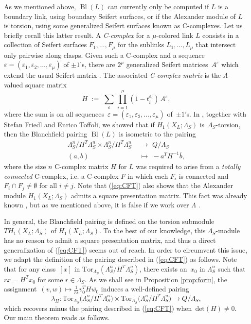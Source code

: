 \documentclass[11pt,a4paper]{amsart}
\theoremstyle{definition}
\def\op{\operatorname}
\begin{document}
As we mentioned above, $\op{Bl}(L)$ can currently only be computed if $L$ is a boundary link, using boundary Seifert surfaces, or if the Alexander module of $L$ is torsion, using some generalized Seifert surfaces known as C-complexes. Let us briefly recall this latter result. A \emph{C-complex} for a $\mu$-colored link $L$ consists in a collection of Seifert surfaces $F_1, \dots , F_\mu$ for the sublinks $L_1, \dots , L_\mu$ that intersect only pairwise along clasps. Given such a C-complex and a sequence~$\varepsilon=(\varepsilon_1,\varepsilon_2,\dots, \varepsilon_\mu)$ of $\pm 1$'s, there are $2^\mu$ generalized Seifert matrices~$A^\varepsilon$ which extend the usual Seifert matrix \cite{CimasoniPotential, CimasoniFlorens, Cooper}. The associated \emph{C-complex matrix} is the $\Lambda$-valued square matrix
$$H\,\,:=\,\,\sum_\varepsilon \,\prod_{i=1}^\mu (1-t_i^{\varepsilon_i}) \, A^\varepsilon,$$
where the sum is on all sequences~$\varepsilon=(\varepsilon_1,\varepsilon_2,\dots, \varepsilon_\mu)$ of~$\pm 1$'s. In \cite[Theorem 1.1]{ConwayFriedlToffoli}, together with Stefan Friedl and Enrico Toffoli, we showed that if $H_1(X_L;\Lambda_S)$ is~$\Lambda_S$-torsion, then the Blanchfield pairing $\op{Bl}(L)$ is isometric to the pairing
\begin{align}
\label{eq:CFT}
\Lambda_S^n / H^T \Lambda_S^n \times \Lambda_S ^n / H^T \Lambda_S^n &\,\,\rightarrow\,\, Q/\Lambda_S \\
(a,b) &\,\,\mapsto\,\, -a^T H^{-1}\overline{b}, \nonumber
\end{align}
where the size $n$ C-complex matrix $H$ for $L$ was required to arise from a \emph{totally connected} C-complex, i.e. a C-complex $F$ in which each $F_i$ is connected and $F_i \cap F_j  \neq \emptyset $ for all $i\neq j$. Note that (\ref{eq:CFT}) also shows that the Alexander module $H_1(X_L;\Lambda_S)$ admits a square presentation matrix. This fact was already known \cite[Corollary 3.6]{CimasoniFlorens}, but as we mentioned above, it is false if we work over $\Lambda$ \cite{CrowellStrauss, Hillman}.

In general, the Blanchfield pairing is defined on the torsion submodule $TH_1(X_L;\Lambda_S)$ of $H_1(X_L;\Lambda_S)$. To the best of our knowledge, this $\Lambda_S$-module has no reason to admit a square presentation matrix, and thus a direct generalization of (\ref{eq:CFT}) seems out of reach. In order to circumvent this issue, we adapt the definition of the pairing described in (\ref{eq:CFT}) as follows.
Note that for any class~$[x]$ in $\text{Tor}_{\Lambda_S}(\Lambda_S^n/H^T\Lambda_S^n)$, there exists an~$x_0$ in $\Lambda_S^n$ such that~$r x=H^Tx_0$ for some $r \in \Lambda_S$. 
As we shall see in Proposition \ref{prop:form}, the assignment~$(v,w)\mapsto \frac{1}{r\overline{s}}v_0^T H\overline{w_0}$ induces a well-defined pairing
$$ \lambda_H\colon \text{Tor}_{\Lambda_S}\big(\Lambda_S^n/H^T\Lambda_S^n\big)\times \text{Tor}_{\Lambda_S}\big(\Lambda_S^n/H^T\Lambda_S^n\big) \to  Q/\Lambda_S,$$
which recovers minus the pairing described in (\ref{eq:CFT}) when~$\text{det}(H) \neq 0$.  Our main theorem reads as follows.
\end{document}
